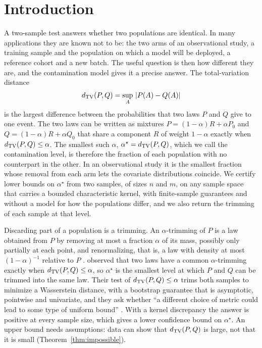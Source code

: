 \section{Introduction}
\label{sec:intro}

A two-sample test answers whether two populations are identical. In many applications they are known not to be: the
two arms of an observational study, a training sample and the population on which a model will be deployed, a
reference cohort and a new batch. The useful question is then how different they are, and the contamination model
\citep{huber1964robust} gives it a precise answer. The total-variation distance
\[
d_{\mathrm{TV}}(P,Q)=\sup_A\,|P(A)-Q(A)|
\]
is the largest difference between the probabilities that two laws $P$ and $Q$ give to one event. The two laws can be
written as mixtures $P=(1-\alpha)R+\alpha P_0$ and $Q=(1-\alpha)R+\alpha Q_0$ that share a component $R$ of weight
$1-\alpha$ exactly when $d_{\mathrm{TV}}(P,Q)\le\alpha$. The smallest such $\alpha$, $\alpha^\star=d_{\mathrm{TV}}(P,Q)$, which we call the
contamination level, is therefore the fraction of each population with no counterpart in the other. In an
observational study it is the smallest fraction whose removal from each arm lets the covariate distributions
coincide. We certify lower bounds on $\alpha^\star$ from two samples, of sizes $n$ and $m$, on any sample
space that carries a bounded characteristic kernel, with finite-sample guarantees and without a model for how the
populations differ, and we also return the trimming of each sample at that level.

Discarding part of a population is a trimming. An $\alpha$-trimming of $P$ is a law obtained from $P$ by removing at
most a fraction $\alpha$ of its mass, possibly only partially at each point, and renormalizing, that is, a law with
density at most $(1-\alpha)^{-1}$ relative to $P$ \citep{gordaliza1991best,alvarez2008trimmed}.
\citet{alvarez2012similarity} observed that two laws have a common $\alpha$-trimming exactly when
$d_{\mathrm{TV}}(P,Q)\le\alpha$, so $\alpha^\star$ is the smallest level at which $P$ and $Q$ can be trimmed into the same law.
Their test of $d_{\mathrm{TV}}(P,Q)\le\alpha$ trims both samples to minimize a Wasserstein distance, with a bootstrap guarantee
that is asymptotic, pointwise and univariate, and they ask whether ``a different choice of metric could lead to some
type of uniform bound'' \citep[p.~617]{alvarez2012similarity}. With a
kernel discrepancy the answer is positive at every sample size, which gives a lower confidence bound on $\alpha^\star$.
An upper bound needs assumptions: data can show that $d_{\mathrm{TV}}(P,Q)$ is large, not that it is small
(Theorem~\ref{thm:impossible}).

